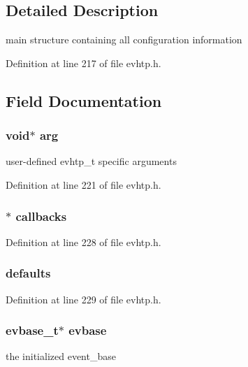 \subsection{Detailed Description}
main structure containing all configuration information 

Definition at line 217 of file evhtp.h.



\subsection{Field Documentation}
\hypertarget{structevhtp__s_a9ce2ec4812a92cb6ab39f6e81e9173a9}{
\subsubsection[{arg}]{\setlength{\rightskip}{0pt plus 5cm}void$\ast$ {\bf arg}}}
\label{structevhtp__s_a9ce2ec4812a92cb6ab39f6e81e9173a9}
user-\/defined evhtp\_\-t specific arguments 

Definition at line 221 of file evhtp.h.

\hypertarget{structevhtp__s_a43bc08d49284feb774b73ee06cf0a769}{
\subsubsection[{callbacks}]{$\ast$ {\bf callbacks}}}
\label{structevhtp__s_a43bc08d49284feb774b73ee06cf0a769}


Definition at line 228 of file evhtp.h.

\hypertarget{structevhtp__s_a5ca39f6268aea8173dbdc0a1e297925b}{
\subsubsection[{defaults}]{ {\bf defaults}}}
\label{structevhtp__s_a5ca39f6268aea8173dbdc0a1e297925b}


Definition at line 229 of file evhtp.h.

\hypertarget{structevhtp__s_abc4ce26b166a97e5766105f253a4fe21}{
\subsubsection[{evbase}]{\setlength{\rightskip}{0pt plus 5cm}evbase\_\-t$\ast$ {\bf evbase}}}
\label{structevhtp__s_abc4ce26b166a97e5766105f253a4fe21}
the initialized event\_\-base 

